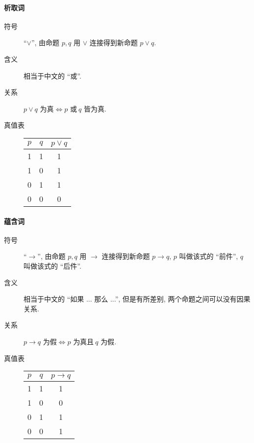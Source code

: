 \documentclass[
    color=black,
    device=normal,
    lang=cn
]{elegantnote}
\begin{document}
\paragraph{析取词}
\begin{description}
    \item[符号] ``$\lor$'', 由命题 $p,q$ 用 $\lor$ 连接得到新命题 $p\lor q$.
    \item[含义] 相当于中文的 ``或''.
    \item[关系] $p\lor q\text{ 为真}\Leftrightarrow p\text{ 或}\ q\text{ 皆为真}$.
    \item[真值表]
        \begin{tabular}{c|c|c}
            $p$ & $q$ & $p\lor q$ \\
            \hline
            1   & 1   & 1         \\
            1   & 0   & 1         \\
            0   & 1   & 1         \\
            0   & 0   & 0
        \end{tabular}
\end{description}
\paragraph{蕴含词}
\begin{description}
    \item[符号] ``$\to$'', 由命题 $p,q$ 用 $\to$ 连接得到新命题 $p\to q$, $p$ 叫做该式的 ``前件'', $q$ 叫做该式的 ``后件''.
    \item[含义] 相当于中文的 ``如果 ... 那么 ...'', 但是有所差别, 两个命题之间可以没有因果关系.
    \item[关系] $p\to q\text{ 为假}\Leftrightarrow p\text{ 为真且}\ q\text{ 为假}$.
    \item[真值表]
        \begin{tabular}{c|c|c}
            $p$ & $q$ & $p\to q$ \\
            \hline
            1   & 1   & 1        \\
            1   & 0   & 0        \\
            0   & 1   & 1        \\
            0   & 0   & 1
        \end{tabular}
\end{description}
\end{document}
